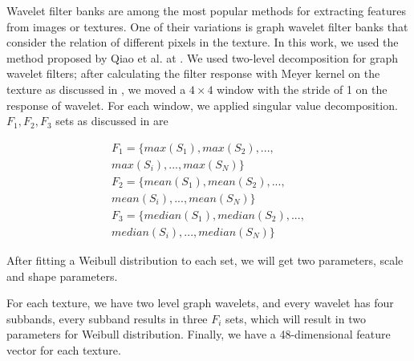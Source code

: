 \documentclass[conference]{IEEEtran}
\begin{document}
Wavelet filter banks are among the most popular methods for extracting features from images or textures. One of their variations is graph wavelet filter banks that consider the relation of different pixels in the texture. In this work, we used the method proposed by Qiao et al. at \cite{wavelet}. We used two-level decomposition for graph wavelet filters; after calculating the filter response with Meyer kernel on the texture as discussed in \cite{wavelet}, we moved a $4\times4$ window with the stride of 1 on the response of wavelet. For each window, we applied singular value decomposition. $F_1 , F_2, F_3$ sets as discussed in \cite{wavelet} are

\begin{equation}
\begin{multlined}
F_1=\{ max(S_1),max(S_2),...,\\max(S_i),...,max(S_N)\}\\
F_2=\{ mean(S_1),mean(S_2),...,\\mean(S_i),...,mean(S_N)\}\\
F_3=\{ median(S_1),median(S_2),...,\\median(S_i),...,median(S_N)\}
\end{multlined}
\end{equation}

After fitting a Weibull distribution to each set, we will get two parameters, scale and shape parameters.

For each texture, we have two level graph wavelets, and every wavelet has four subbands, every subband results in three $F_i$ sets, which will result in two parameters for Weibull distribution. Finally, we have a 48-dimensional feature vector for each texture.
\end{document}
